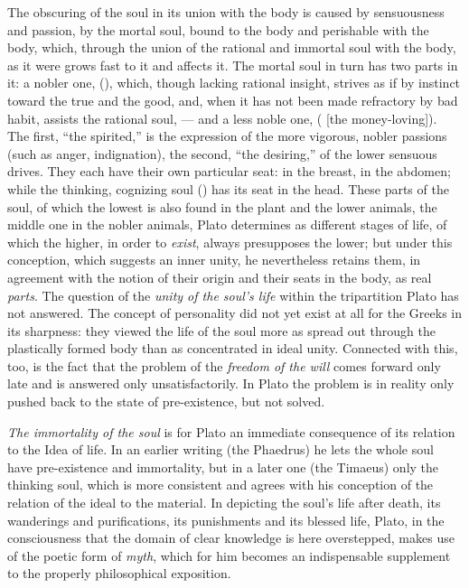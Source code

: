 The obscuring of the soul in its union with the body is caused by sensuousness and passion, by the mortal soul, bound to the body
and perishable with the body, which,
through the union of the rational and immortal soul with the body,
as it were grows fast to it and affects it. The mortal
soul in turn has two parts in it: a nobler one,  (),
which, though lacking rational insight, strives as if by instinct toward the true and the good, and, when it
has not been made refractory by bad habit, assists the rational
soul, --- and a less noble one,  ( [the money-loving]).
The first, ``the spirited,'' is the expression of the more vigorous,
nobler passions (such as anger, indignation), the second, ``the
desiring,'' of the lower sensuous drives. They each have
their own particular seat:  in the breast,  in the abdomen;
while the thinking, cognizing soul () has
its seat in the head. These parts of the soul, of which the
lowest is also found in the plant and the lower animals, the middle one in the nobler animals, Plato determines as different
stages of life, of which the higher, in order to \emph{exist}, always presupposes the lower; but under this conception, which suggests an
inner unity, he nevertheless retains them, in agreement with
the notion of their origin and their seats in the body,
as real \emph{parts}. The question of the \emph{unity of the soul's life}
within the tripartition Plato has not answered. The concept of personality
did not yet exist at all for the Greeks in its sharpness:
they viewed the life of the soul more as spread out through the plastically
formed body than as concentrated in ideal unity. Connected
with this, too, is the fact that the problem of the \emph{freedom of the will} comes forward only late and is answered only unsatisfactorily.
In Plato the problem is in reality only pushed back to
the state of pre-existence, but not solved.

\emph{The immortality of the soul} is for Plato an immediate
consequence of its relation to the Idea of life. In an earlier writing
(the Phaedrus) he lets the whole soul have pre-existence and immortality, but in a later one (the Timaeus) only the thinking soul,
which is more consistent and agrees with his conception
of the relation of the ideal to the material. In depicting
the soul's life after death, its wanderings and purifications, its
punishments and its blessed life, Plato, in the consciousness
that the domain of clear knowledge is here overstepped, makes use of the poetic form of \emph{myth}, which for him becomes an indispensable supplement to the properly philosophical exposition.

